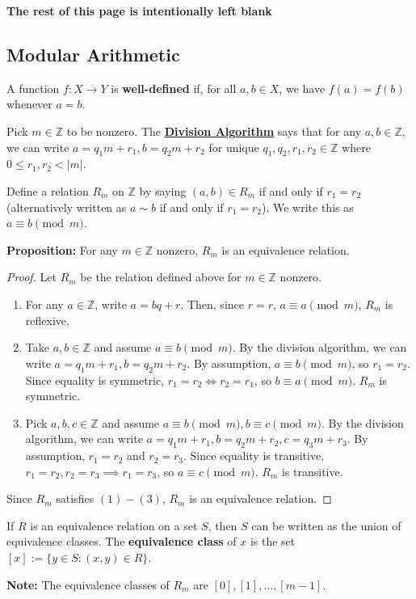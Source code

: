 \documentclass [12pt] {article}
\newcommand{\Z}{\mathbb{Z}}
\newenvironment{definition}[1]{\begin{tcolorbox}[title={Definition: #1},colback=blue!5!white,colframe=black!75!blue]}{\end{tcolorbox}}
\renewcommand{\href}[2]{\hyperref[#1]{\bf{\underline{{#2}}}}}
\renewcommand{\bf}[1]{\textbf{{#1}}}
\begin{document}
\begin{center}
    \vspace{5em}
    \bf{The rest of this page is intentionally left blank}
\end{center}

\newpage
\subsection{Modular Arithmetic}
\begin{definition}{Well-Defined Functions}
    A function $f : X \to Y$ is \bf{well-defined} if, for all $a, b \in X$, we have $f(a) = f(b)$
    whenever $a = b$.
\end{definition}

Pick $m \in \Z$ to be nonzero. The \href{thm:divalgo}{Division Algorithm} says that for any $a, b
\in \Z$, we can write $a = q_1 m + r_1, b = q_2 m + r_2$ for unique $q_1, q_2, r_1, r_2 \in \Z$
where $0 \leq r_1, r_2 < |m|$.
\begin{definition}{Modulo}
    Define a relation $R_m$ on $\Z$ by saying $(a, b) \in R_m$ if and only if $r_1 = r_2$
    (alternatively written as $a \sim b$ if and only if $r_1 = r_2$). We write this as
    $a \equiv b \pmod{m}$. 
\end{definition}
\bf{Proposition:} For any $m \in \Z$ nonzero, $R_m$ is an equivalence relation.
\begin{proof}
    Let $R_m$ be the relation defined above for $m \in \Z$ nonzero.
    \begin{enumerate}[label=(\arabic*)]
        \item For any $a \in \Z$, write $a = bq + r$. Then, since $r = r$, $a \equiv a
            \pmod{m}$, $R_m$ is reflexive.
        \item Take $a, b \in \Z$ and assume $a \equiv b \pmod{m}$. By the division algorithm,
            we can write $a = q_1 m + r_1, b = q_2 m + r_2$. By assumption, $a \equiv b \pmod{m}$, 
            so $r_1 = r_2$. Since equality is symmetric, $r_1 = r_2 \iff r_2 = r_1$, so
            $b \equiv a \pmod{m}$. $R_m$ is symmetric.
        \item Pick $a, b, c \in \Z$ and assume $a \equiv b \pmod{m}, b \equiv c \pmod{m}$.
            By the division algorithm, we can write 
            $a = q_1 m + r_1, b = q_2 m + r_2, c = q_3 m + r_3$. By assumption, $r_1 = r_2$ and
            $r_2 = r_3$. Since equality is transitive, $r_1 = r_2, r_2 = r_3 \implies r_1 = r_3$,
            so $a \equiv c \pmod{m}$. $R_m$ is transitive.
    \end{enumerate}
    Since $R_m$ satisfies $(1)-(3)$, $R_m$ is an equivalence relation.
\end{proof}
\begin{definition}{Equivalence Class}
    If $R$ is an equivalence relation on a set $S$, then $S$ can be written as the union of
    equivalence classes. The \bf{equivalence class} of $x$ is the set 
    $[x] := \{ y \in S : (x, y) \in R \}$.
\end{definition}
\bf{Note:} The equivalence classes of $R_m$ are $[0], [1], \ldots, [m - 1]$.
\end{document}
